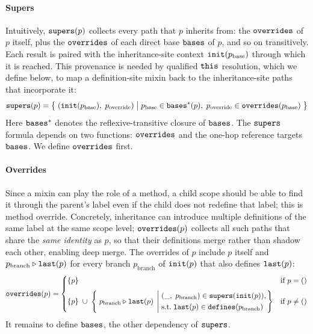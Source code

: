 \paragraph{Supers}
Intuitively, $\mathtt{supers}(p)$ collects every path that $p$ inherits from:
the $\mathtt{overrides}$ of $p$ itself,
plus the $\mathtt{overrides}$ of each
direct base $\mathtt{bases}$ of $p$, and so on transitively.
Each result is paired with the inheritance-site context
$\mathtt{init}(p_{\mathrm{base}})$ through which it is reached.
This provenance is needed by qualified $\mathtt{this}$ resolution,
which we define below, to map a definition-site mixin back to
the inheritance-site paths that incorporate it:
\begin{equation}\label{eq:supers}
  \mathtt{supers}(p) =
  \bigl\{\; (\mathtt{init}(p_{\mathrm{base}}),\; p_{\mathrm{override}}) \;\big|\;
    p_{\mathrm{base}} \in \mathtt{bases}^*(p),\;
    p_{\mathrm{override}} \in \mathtt{overrides}(p_{\mathrm{base}})
  \;\bigr\}
\end{equation}
Here $\mathtt{bases}^*$ denotes the reflexive-transitive closure of $\mathtt{bases}$.
The $\mathtt{supers}$ formula depends on two functions:
$\mathtt{overrides}$ and the one-hop reference targets $\mathtt{bases}$.
We define $\mathtt{overrides}$ first.

\paragraph{Overrides}
Since a mixin can play the role of a method,
a child scope should be
able to find it through the parent's label even if the child
does not redefine that label; this is method override.
Concretely, inheritance can introduce multiple
definitions of the same label at the same scope level;
$\mathtt{overrides}(p)$ collects all such paths that share the
\emph{same identity} as $p$, so that their definitions
merge rather than shadow each other, enabling deep merge.
The overrides of $p$ include $p$ itself
and $p_{\mathrm{branch}} \mathbin{\triangleright} \mathtt{last}(p)$ for every
branch $p_{\mathrm{branch}}$ of $\mathtt{init}(p)$ that also defines $\mathtt{last}(p)$:
\begin{equation}\label{eq:overrides}
  \mathtt{overrides}(p) =
  \begin{cases}
    \{p\} & \text{if } p = ()  \\[6pt]
    \{p\}
    \;\cup\;
    \left\{\; p_{\mathrm{branch}} \mathbin{\triangleright} \mathtt{last}(p) \;\left|\;
      \begin{aligned}
        &(\_,\; p_{\mathrm{branch}}) \in \mathtt{supers}(\mathtt{init}(p)), \\
        &\text{s.t.}\; \mathtt{last}(p) \in \mathtt{defines}(p_{\mathrm{branch}})
      \end{aligned}
    \right.\right\}
    & \text{if } p \neq ()
  \end{cases}
\end{equation}
It remains to define $\mathtt{bases}$, the other dependency of $\mathtt{supers}$.

